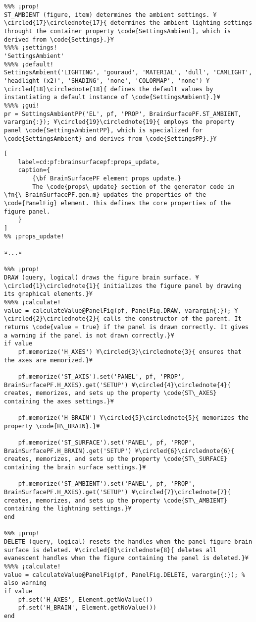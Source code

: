 \documentclass{tufte-handout}
\begin{document}
\begin{lstlisting}
%%% ¡prop!
ST_AMBIENT (figure, item) determines the ambient settings. ¥\circled{17}\circlednote{17}{ determines the ambient lighting settings throught the container property \code{SettingsAmbient}, which is derived from \code{Settings}.}¥
%%%% ¡settings!
'SettingsAmbient'
%%%% ¡default!
SettingsAmbient('LIGHTING', 'gouraud', 'MATERIAL', 'dull', 'CAMLIGHT', 'headlight (x2)', 'SHADING', 'none', 'COLORMAP', 'none') ¥\circled{18}\circlednote{18}{ defines the default values by instantiating a default instance of \code{SettingsAmbient}.}¥
%%%% ¡gui!
pr = SettingsAmbientPP('EL', pf, 'PROP', BrainSurfacePF.ST_AMBIENT, varargin{:}); ¥\circled{19}\circlednote{19}{ employs the property panel \code{SettingsAmbientPP}, which is specialized for \code{SettingsAmbient} and derives from \code{SettingsPP}.}¥
\end{lstlisting}

\begin{lstlisting}[
	label=cd:pf:brainsurfacepf:props_update,
	caption={
		{\bf BrainSurfacePF element props update.}
		The \code{props\_update} section of the generator code in \fn{\_BrainSurfacePF.gen.m} updates the properties of the \code{PanelFig} element. This defines the core properties of the figure panel.
	}
]
%% ¡props_update!

¤...¤

%%% ¡prop!
DRAW (query, logical) draws the figure brain surface. ¥\circled{1}\circlednote{1}{ initializes the figure panel by drawing its graphical elements.}¥
%%%% ¡calculate!
value = calculateValue@PanelFig(pf, PanelFig.DRAW, varargin{:}); ¥\circled{2}\circlednote{2}{ calls the constructor of the parent. It returns \code{value = true} if the panel is drawn correctly. It gives a warning if the panel is not drawn correctly.}¥
if value
    pf.memorize('H_AXES') ¥\circled{3}\circlednote{3}{ ensures that the axes are memorized.}¥

    pf.memorize('ST_AXIS').set('PANEL', pf, 'PROP', BrainSurfacePF.H_AXES).get('SETUP') ¥\circled{4}\circlednote{4}{ creates, memorizes, and sets up the property \code{ST\_AXES} containing the axes settings.}¥
    
    pf.memorize('H_BRAIN') ¥\circled{5}\circlednote{5}{ memorizes the property \code{H\_BRAIN}.}¥

    pf.memorize('ST_SURFACE').set('PANEL', pf, 'PROP', BrainSurfacePF.H_BRAIN).get('SETUP') ¥\circled{6}\circlednote{6}{ creates, memorizes, and sets up the property \code{ST\_SURFACE} containing the brain surface settings.}¥
    
    pf.memorize('ST_AMBIENT').set('PANEL', pf, 'PROP', BrainSurfacePF.H_AXES).get('SETUP') ¥\circled{7}\circlednote{7}{ creates, memorizes, and sets up the property \code{ST\_AMBIENT} containing the lightning settings.}¥
end

%%% ¡prop!
DELETE (query, logical) resets the handles when the panel figure brain surface is deleted. ¥\circled{8}\circlednote{8}{ deletes all evanescent handles when the figure containing the panel is deleted.}¥
%%%% ¡calculate!
value = calculateValue@PanelFig(pf, PanelFig.DELETE, varargin{:}); % also warning
if value
    pf.set('H_AXES', Element.getNoValue())
    pf.set('H_BRAIN', Element.getNoValue())
end
\end{lstlisting}
\end{document}
